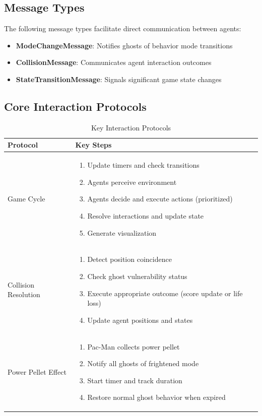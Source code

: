 \documentclass[a4paper, 11pt]{article}
\begin{document}
\subsection{Message Types}

The following message types facilitate direct communication between agents:

\begin{itemize}
    \item \textbf{ModeChangeMessage}: Notifies ghosts of behavior mode transitions
    \item \textbf{CollisionMessage}: Communicates agent interaction outcomes
    \item \textbf{StateTransitionMessage}: Signals significant game state changes
\end{itemize}

\clearpage

\subsection{Core Interaction Protocols}

\begin{table}[h]
\centering
\caption{Key Interaction Protocols}
\begin{tabular}{|p{3.5cm}|p{10.5cm}|}
\hline
\textbf{Protocol} & \textbf{Key Steps} \\
\hline
Game Cycle & 
\begin{enumerate}
    \item Update timers and check transitions
    \item Agents perceive environment
    \item Agents decide and execute actions (prioritized)
    \item Resolve interactions and update state
    \item Generate visualization
\end{enumerate} \\
\hline
Collision Resolution & 
\begin{enumerate}
    \item Detect position coincidence
    \item Check ghost vulnerability status
    \item Execute appropriate outcome (score update or life loss)
    \item Update agent positions and states
\end{enumerate} \\
\hline
Power Pellet Effect & 
\begin{enumerate}
    \item Pac-Man collects power pellet
    \item Notify all ghosts of frightened mode
    \item Start timer and track duration
    \item Restore normal ghost behavior when expired
\end{enumerate} \\
\hline
\end{tabular}
\end{table}

%
% 
% 
\end{document}
